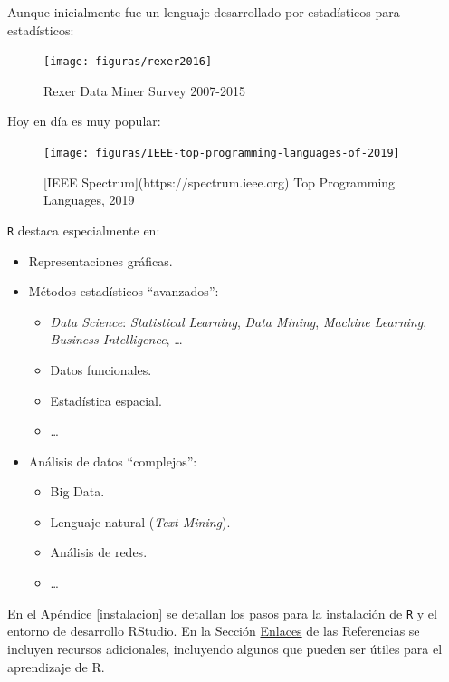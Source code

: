 \documentclass[
]{book}
\theoremstyle{break}
\theoremstyle{nonumberplain}
\begin{document}
Aunque inicialmente fue un lenguaje desarrollado por estadísticos
para estadísticos:

\begin{figure}[!htb]

{\centering \texttt{[image: figuras/rexer2016]} 

}

\caption{Rexer Data Miner Survey 2007-2015}\label{fig:rexer}
\end{figure}

Hoy en día es muy popular:

\begin{figure}[!htb]

{\centering \texttt{[image: figuras/IEEE-top-programming-languages-of-2019]} 

}

\caption{[IEEE Spectrum](https://spectrum.ieee.org) Top Programming Languages, 2019}\label{fig:ieee}
\end{figure}

\texttt{R} destaca especialmente en:

\begin{itemize}
\item
  Representaciones gráficas.
\item
  Métodos estadísticos ``avanzados'':

  \begin{itemize}
  \item
    \emph{Data Science}: \emph{Statistical Learning}, \emph{Data Mining},
    \emph{Machine Learning}, \emph{Business Intelligence}, \ldots{}
  \item
    Datos funcionales.
  \item
    Estadística espacial.
  \item
    \ldots{}
  \end{itemize}
\item
  Análisis de datos ``complejos'':

  \begin{itemize}
  \item
    Big Data.
  \item
    Lenguaje natural (\emph{Text Mining}).
  \item
    Análisis de redes.
  \item
    \ldots{}
  \end{itemize}
\end{itemize}

En el Apéndice \ref{instalacion} se detallan los pasos para la instalación de \texttt{R} y el entorno de desarrollo RStudio.
En la Sección \protect\hyperlink{links}{Enlaces} de las Referencias se incluyen recursos adicionales, incluyendo algunos que pueden ser útiles para el aprendizaje de R.
\end{document}
